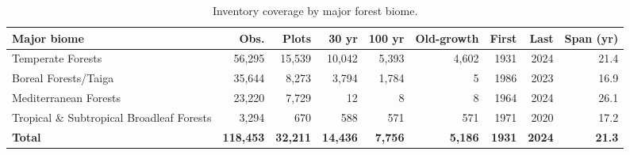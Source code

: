 \begingroup
\sffamily\small
\setlength{\tabcolsep}{3pt}

\begin{longtable}[t]{@{}p{3.2cm}rrrrrrrr@{}}
\caption{\label{tab:coverage-biome}Inventory coverage by major forest biome.}\\
\toprule
Major biome & Obs. & Plots & 30 yr & 100 yr & Old-growth & First & Last & Span (yr)\\
\midrule
Temperate Forests & 56,295 & 15,539 & 10,042 & 5,393 & 4,602 & 1931 & 2024 & 21.4\\
Boreal Forests/Taiga & 35,644 & 8,273 & 3,794 & 1,784 & 5 & 1986 & 2023 & 16.9\\
Mediterranean Forests & 23,220 & 7,729 & 12 & 8 & 8 & 1964 & 2024 & 26.1\\
Tropical \& Subtropical Broadleaf Forests & 3,294 & 670 & 588 & 571 & 571 & 1971 & 2020 & 17.2\\
\textbf{Total} & \textbf{118,453} & \textbf{32,211} & \textbf{14,436} & \textbf{7,756} & \textbf{5,186} & \textbf{1931} & \textbf{2024} & \textbf{21.3}\\
\bottomrule
\end{longtable}
\endgroup
